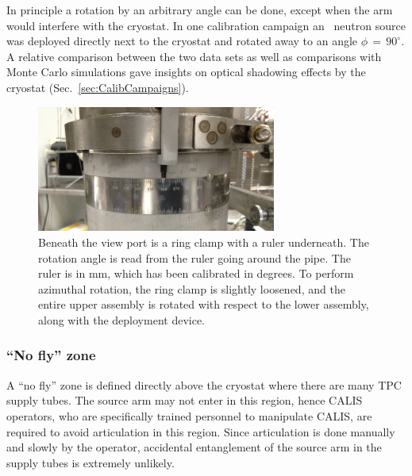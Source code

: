 In principle a rotation by an arbitrary angle can be done, except when the arm would interfere with the cryostat. In one calibration campaign an \AmBe\ neutron source was deployed directly next to the cryostat and rotated away to an angle $\phi\,=\,90^\circ$.  A relative comparison between the two data sets as well as comparisons with Monte Carlo simulations gave insights on optical shadowing effects by the cryostat (Sec.~\ref{sec:CalibCampaigns}). 



\begin{figure}[htbp]
 \centering
  \includegraphics[width=0.7\textwidth]{Figures/RingClamp_WithPin_IMG_2669.JPG}
  \caption{Beneath the view port is a ring clamp with a ruler underneath. The rotation angle is read from the ruler going around the pipe. The ruler is in mm, which has been calibrated in degrees. To perform azimuthal rotation, the ring clamp is slightly loosened, and the entire upper assembly is rotated with respect to the lower assembly, along with the deployment device.}
  \label{fig:ring_clamp}
\end{figure} 

\subsubsection*{``No fly'' zone}
A ``no fly'' zone is defined directly above the cryostat where there are many TPC supply tubes. The source arm may not enter in this region, hence CALIS operators, who are specifically trained personnel to manipulate CALIS, are required to avoid articulation in this region. Since articulation is done manually and slowly by the operator, accidental entanglement of the source arm in the supply tubes is extremely unlikely.

